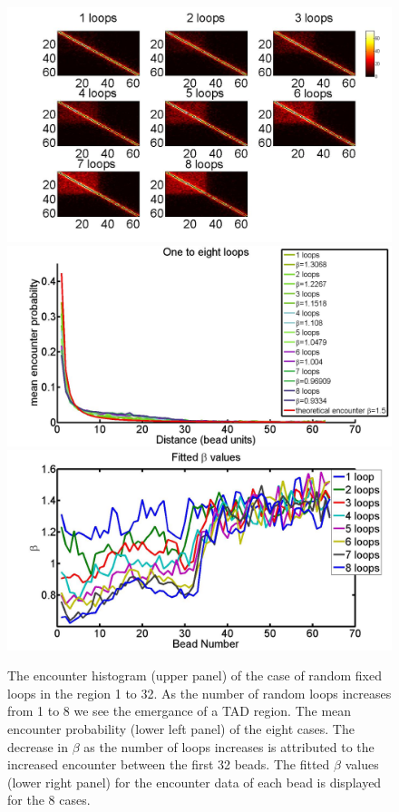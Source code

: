 \documentclass[12pt]{paper}
\begin{document}
\begin{figure}[H]
\centering
\includegraphics[scale=0.25]{encounterHistogram_1to8Loops}
\includegraphics[scale=0.12]{meanEncounterProbabilityOneTAD1To8Loops}
\includegraphics[scale=0.12]{fittedExpOneTAD1To8Loops}
\caption{\scriptsize{The encounter histogram (upper panel) of the case of random fixed loops in the region 1 to 32. As the number of random loops increases from 1 to 8 we see the emergance of a TAD region. The mean encounter probability (lower left panel) of the eight cases. The decrease in $\beta$ as the number of loops increases is attributed to the increased encounter between the first 32 beads. The fitted $\beta$ values (lower right panel) for the encounter data of each bead is displayed for the 8 cases.}}
\end{figure}
\end{document}
